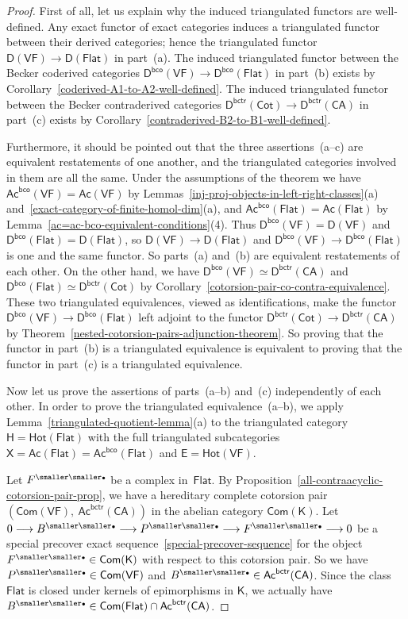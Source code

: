 \documentclass[12pt,a4paper]{amsart}
\newcommand{\+}{\nobreakdash-}
\renewcommand{\:}{\colon}
\newcommand{\rarrow}{\longrightarrow}
\newcommand{\bu}{{\text{\smaller\smaller$\scriptstyle\bullet$}}}
\newcommand{\sD}{\mathsf D}
\newcommand{\sE}{\mathsf E}
\newcommand{\sH}{\mathsf H}
\newcommand{\sK}{\mathsf K}
\newcommand{\sX}{\mathsf X}
\newcommand{\VF}{\mathsf{VF}}
\newcommand{\CA}{\mathsf{CA}}
\newcommand{\Flat}{\mathsf{Flat}}
\newcommand{\Cot}{\mathsf{Cot}}
\newcommand{\Hot}{\mathsf{Hot}}
\newcommand{\Com}{\mathsf{Com}}
\newcommand{\Ac}{\mathsf{Ac}}
\newcommand{\bco}{\mathsf{bco}}
\newcommand{\bctr}{\mathsf{bctr}}
\theoremstyle{plain}
\theoremstyle{definition}
\begin{document}
\begin{proof}
 First of all, let us explain why the induced triangulated functors
are well-defined.
 Any exact functor of exact categories induces a triangulated functor
between their derived categories; hence the triangulated functor
$\sD(\VF)\rarrow\sD(\Flat)$ in part~(a).
 The induced triangulated functor between the Becker coderived
categories $\sD^\bco(\VF)\rarrow\sD^\bco(\Flat)$ in part~(b) exists by
Corollary~\ref{coderived-A1-to-A2-well-defined}.
 The induced triangulated functor between the Becker contraderived
categories $\sD^\bctr(\Cot)\rarrow\sD^\bctr(\CA)$ in part~(c) exists by
Corollary~\ref{contraderived-B2-to-B1-well-defined}.

 Furthermore, it should be pointed out that the three assertions~(a\+-c)
are equivalent restatements of one another, and the triangulated
categories involved in them are all the same.
 Under the assumptions of the theorem we have
$\Ac^\bco(\VF)=\Ac(\VF)$ by
Lemmas~\ref{inj-proj-objects-in-left-right-classes}(a)
and~\ref{exact-category-of-finite-homol-dim}(a),
and $\Ac^\bco(\Flat)=\Ac(\Flat)$ by
Lemma~\ref{ac=ac-bco-equivalent-conditions}(4).
 Thus $\sD^\bco(\VF)=\sD(\VF)$ and $\sD^\bco(\Flat)=\sD(\Flat)$, so
$\sD(\VF)\rarrow\sD(\Flat)$ and $\sD^\bco(\VF)\rarrow\sD^\bco(\Flat)$
is one and the same functor.
 So parts~(a) and~(b) are equivalent restatements of each other.
 On the other hand, we have $\sD^\bco(\VF)\simeq\sD^\bctr(\CA)$
and $\sD^\bco(\Flat)\simeq\sD^\bctr(\Cot)$ by
Corollary~\ref{cotorsion-pair-co-contra-equivalence}.
 These two triangulated equivalences, viewed as identifications,
make the functor $\sD^\bco(\VF)\rarrow\sD^\bco(\Flat)$ left adjoint
to the functor $\sD^\bctr(\Cot)\rarrow\sD^\bctr(\CA)$ by
Theorem~\ref{nested-cotorsion-pairs-adjunction-theorem}.
 So proving that the functor in part~(b) is a triangulated equivalence
is equivalent to proving that the functor in part~(c) is a triangulated
equivalence.

 Now let us prove the assertions of parts~(a\+-b) and~(c) independently
of each other.
 In order to prove the triangulated equivalence~(a\+-b), we apply
Lemma~\ref{triangulated-quotient-lemma}(a) to the triangulated
category $\sH=\Hot(\Flat)$ with the full triangulated subcategories
$\sX=\Ac(\Flat)=\Ac^\bco(\Flat)$ and $\sE=\Hot(\VF)$.

 Let $F^\bu$ be a complex in~$\Flat$.
 By Proposition~\ref{all-contraacyclic-cotorsion-pair-prop}, we
have a hereditary complete cotorsion pair $(\Com(\VF),\>\Ac^\bctr(\CA))$
in the abelian category $\Com(\sK)$.
 Let $0\rarrow B^\bu\rarrow P^\bu\rarrow F^\bu\rarrow0$ be a special
precover exact sequence~\eqref{special-precover-sequence} for
the object $F^\bu\in\Com(\sK)$ with respect to this cotorsion pair.
 So we have $P^\bu\in\Com(\VF)$ and $B^\bu\in\Ac^\bctr(\CA)$.
 Since the class $\Flat$ is closed under kernels of epimorphisms in
$\sK$, we actually have $B^\bu\in\Com(\Flat)\cap\Ac^\bctr(\CA)$.


\end{proof}
\end{document}
